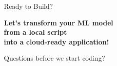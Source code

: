 \documentclass[../main.tex]{subfiles}
\begin{document}
\begin{frame}{Ready to Build?}
    \begin{center}
        \textbf{Let's transform your ML model} \\
        \textbf{from a local script} \\
        \textbf{into a cloud-ready application!}

        \bigskip
        \bigskip

        \Large{Questions before we start coding?}
    \end{center}
\end{frame}
\end{document}
